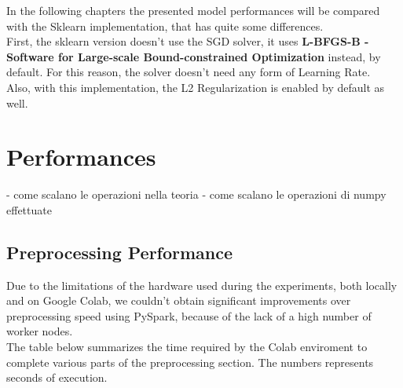 \documentclass[
	letterpaper, %
	10pt, %
]{class}
\begin{document}
In the following chapters the presented model performances will be compared with the Sklearn implementation, that has quite some differences.\\
First, the sklearn version doesn't use the SGD solver, it uses \textbf{L-BFGS-B - Software for Large-scale Bound-constrained Optimization} instead, by default.
For this reason, the solver doesn't need any form of Learning Rate.\\
Also, with this implementation, the L2 Regularization is enabled by default as well.




\section{Performances}

- come scalano le operazioni nella teoria
- come scalano le operazioni di numpy effettuate

\subsection{Preprocessing Performance}

Due to the limitations of the hardware used during the experiments, both locally and on Google Colab, we couldn't obtain significant improvements over preprocessing speed using PySpark, because of the lack of a high number of worker nodes.\\

The table below summarizes the time required by the Colab enviroment to complete various parts of the preprocessing section.
The numbers represents seconds of execution.
\end{document}
